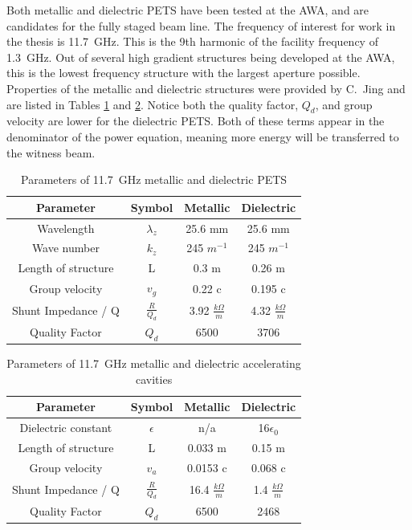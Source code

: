 Both metallic and dielectric PETS have been tested at the AWA, 
and are candidates for the fully staged beam line. 
The frequency of interest for work in the thesis is \SI{11.7}{GHz}. 
This is the 9th harmonic of the facility frequency of \SI{1.3}{GHz}.
Out of several high gradient structures being developed at the AWA, 
this is the lowest frequency structure with the largest aperture possible. 
Properties of the metallic and dielectric structures were provided by C.~Jing and are listed in 
Tables \ref{table:PETS} and \ref{table:acc}. 
Notice both the quality factor, $Q_d$, and group velocity are lower for the dielectric PETS. 
Both of these terms appear in the denominator of the power equation, meaning more
energy will be transferred to the witness beam.
\begin{table}
	\begin{center}
	\caption{Parameters of \SI{11.7}{GHz} metallic and dielectric PETS}
	\label{table:PETS}
	
			\begin{tabular}{cccc}  
			\toprule
			\toprule
			\textbf{Parameter} & \textbf{Symbol} & \textbf{Metallic }& \textbf{Dielectric} \\
			\midrule
			Wavelength 	& $\lambda_{z}$ & 25.6 mm 	&  25.6 mm	\\  
			Wave number & $k_{z}$ 		& 245 $m^{-1}$ 	& 245 $m^{-1}$\\  
			Length of structure & L & 0.3 m & 0.26 m\\  
			Group velocity & $v_{g}$ & 0.22 c & 0.195 c\\  
			Shunt Impedance / Q & $\frac{R}{Q_{d}}$ & 3.92 $\frac{k\Omega}{m}$  & 4.32 $\frac{k\Omega}{m}$\\  
			Quality Factor & $Q_{d}$ & 6500 &3706\\  
			\bottomrule		
		\end{tabular}
\end{center}
\end{table}
\begin{table}
	\begin{center}
		\caption{Parameters of \SI{11.7}{GHz} metallic and dielectric accelerating cavities}
		\label{table:acc}
		
		\begin{tabular}{cccc}  
			\toprule
			\toprule
			\textbf{Parameter} & \textbf{Symbol} & \textbf{Metallic }& \textbf{Dielectric} \\
			\midrule
			Dielectric constant & $\epsilon$ & n/a & 16\;$\epsilon_0$ \\
			Length of structure & L & 0.033 m & 0.15 m\\  
			Group velocity & $v_{a}$ & 0.0153 c & 0.068 c\\  
			Shunt Impedance / Q & $\frac{R}{Q_{d}}$ & 16.4 $\frac{k\Omega}{m}$  & 1.4 $\frac{k\Omega}{m}$\\  
			Quality Factor & $Q_{d}$ & 6500  &2468\\  
			\bottomrule		
		\end{tabular}
	\end{center}
\end{table}


